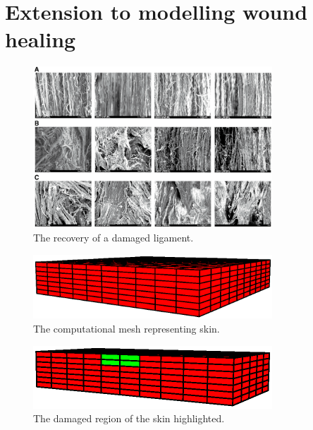 \section{Extension to modelling wound healing}
\label{wound-healing-example}



\begin{figure}[!hpt]
\centering
\includegraphics[width=0.8\textwidth]
                {images/experiments/healing-damaged-ligament} 
\caption{The recovery of a damaged ligament.}
\label{healing-damaged-ligament}
\end{figure}

\begin{figure}[!hpt]
\centering
\includegraphics[width=0.8\textwidth]
                {images/examples/lagrangian/healing/full-skin-mesh} 
\caption{The computational mesh representing skin.}
\label{healing-skin-mesh}
\end{figure}

\begin{figure}[!hpt]
\centering
\includegraphics[width=0.8\textwidth]
                {images/examples/lagrangian/healing/damaged-region} 
\caption{The damaged region of the skin highlighted.}
\label{healing-damaged-region}
\end{figure}

